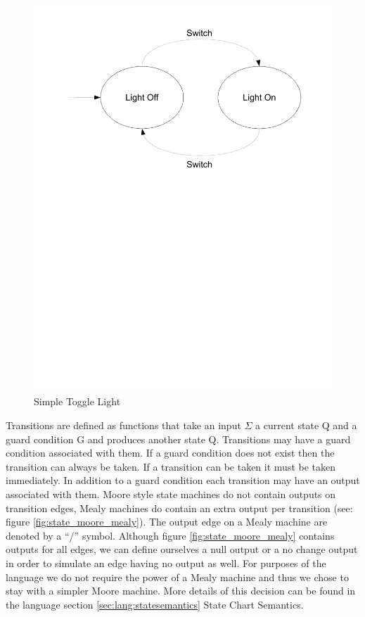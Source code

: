 \begin{figure}[htp]
    \centering
    \includegraphics[trim= 10mm 150mm 10mm 10mm, clip, width=\imgmedium]{./images/state_blink_light.pdf}
    \caption{Simple Toggle Light}
    \label{fig:state_blink_light}
\end{figure}

Transitions are defined as functions that take an input $\Sigma$ a current state Q and a guard condition G and produces another state Q. Transitions may have a guard condition associated with them. If a guard condition does not exist then the transition can always be taken. If a transition can be taken it must be taken immediately. In addition to a guard condition each transition may have an output associated with them. Moore style state machines do not contain outputs on transition edges, Mealy machines do contain an extra output per transition (see: figure \ref{fig:state_moore_mealy}). The output edge on a Mealy machine are denoted by a ``/'' symbol. Although figure \ref{fig:state_moore_mealy} contains outputs for all edges, we can define ourselves a null output or a no change output in order to simulate an edge having no output as well. For purposes of the \plccharts language we do not require the power of a Mealy machine and thus we chose to stay with a simpler Moore machine. More details of this decision can be found in the language section \ref{sec:lang:statesemantics} State Chart Semantics.


